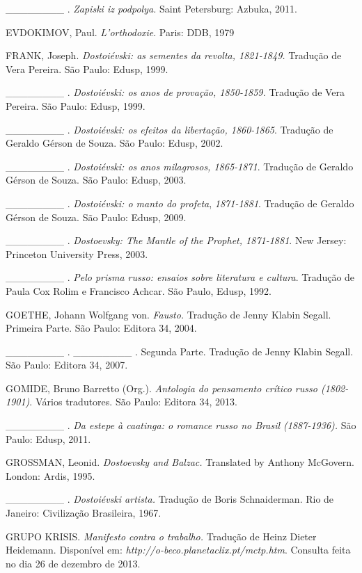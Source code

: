 \_\_\_\_\_\_\_\_ . \emph{Zapiski iz podpolya.} Saint Petersburg: Azbuka,
2011.

EVDOKIMOV, Paul. \emph{L'orthodoxie}. Paris: DDB, 1979

FRANK, Joseph. \emph{Dostoiévski: as sementes da revolta, 1821-1849.}
Tradução de Vera Pereira. São Paulo: Edusp, 1999.

\_\_\_\_\_\_\_\_ . \emph{Dostoiévski: os anos de provação, 1850-1859.}
Tradução de Vera Pereira. São Paulo: Edusp, 1999.

\_\_\_\_\_\_\_\_ . \emph{Dostoiévski: os efeitos da libertação,
1860-1865}. Tradução de Geraldo Gérson de Souza. São Paulo: Edusp, 2002.

\_\_\_\_\_\_\_\_ . \emph{Dostoiévski: os anos milagrosos, 1865-1871}.
Tradução de Geraldo Gérson de Souza. São Paulo: Edusp, 2003.

\_\_\_\_\_\_\_\_ . \emph{Dostoiévski: o manto do profeta},
\emph{1871-1881}. Tradução de Geraldo Gérson de Souza. São Paulo: Edusp,
2009.

\_\_\_\_\_\_\_\_ . \emph{Dostoevsky: The Mantle of the Prophet,
1871-1881}. New Jersey: Princeton University Press, 2003.

\_\_\_\_\_\_\_\_ . \emph{Pelo prisma russo: ensaios sobre literatura e
cultura}. Tradução de Paula Cox Rolim e Francisco Achcar. São Paulo,
Edusp, 1992.

GOETHE, Johann Wolfgang von. \emph{Fausto.} Tradução de Jenny Klabin
Segall. Primeira Parte. São Paulo: Editora 34, 2004.

\_\_\_\_\_\_\_\_ . \_\_\_\_\_\_\_\_ . Segunda Parte. Tradução de Jenny
Klabin Segall. São Paulo: Editora 34, 2007.

GOMIDE, Bruno Barretto (Org.). \emph{Antologia do pensamento crítico
russo (1802-1901)}. Vários tradutores. São Paulo: Editora 34, 2013.

\_\_\_\_\_\_\_\_ . \emph{Da estepe à caatinga: o romance russo no Brasil
(1887-1936).} São Paulo: Edusp, 2011.

GROSSMAN, Leonid. \emph{Dostoevsky and Balzac.} Translated by Anthony
McGovern. London: Ardis, 1995.

\_\_\_\_\_\_\_\_ . \emph{Dostoiévski artista.} Tradução de Boris
Schnaiderman. Rio de Janeiro: Civilização Brasileira, 1967.

GRUPO KRISIS. \emph{Manifesto contra o trabalho.} Tradução de Heinz
Dieter Heidemann. Disponível em:
\emph{http://o-beco.planetaclix.pt/mctp.htm}.
Consulta feita no dia 26 de dezembro de 2013.


